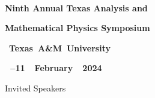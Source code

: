 \documentclass[a3,portrait]{a0poster}
\makeatletter
\providecommand{\LenToUnit}[1]{#1\@gobble}
\newcommand{\PRH}[5]{%
\AddToShipoutPicture*{\put(\LenToUnit{#3},\LenToUnit{#4}){%
     \parbox[b][\paperheight]{\paperwidth}{%
       \vfill
       \centering
       \texttt{[image: \#5]}%
       \vfill
     }}}
}
\makeatother
\begin{document}
\begin{center}


\ \vskip -15mm




\color{white}
{\bfseries\LARGE
Ninth Annual Texas Analysis and
}

\vskip 4mm

{\bfseries\LARGE Mathematical Physics Symposium
}



\vskip 1cm



\mbox{
\textbf{
\Large
\quad
Texas A\&M University
}
}

\vskip 1cm

\mbox{
\textbf{
\large
{}\,--11 \ February \ 2024
}
}


\end{center}



\medskip

\color{PomegranateRed}





\vskip 5cm

\hskip 7cm{\bsifamily\large Invited Speakers}

\vskip 1cm
\end{document}
